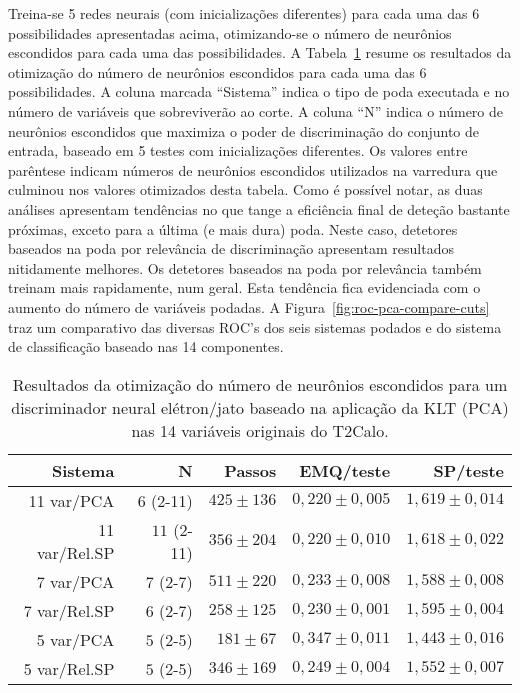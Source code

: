 Treina-se 5 redes neurais (com inicializações diferentes) para cada uma das 6
possibilidades apresentadas acima, otimizando-se o número de neurônios
escondidos para cada uma das possibilidades. A
Tabela~\ref{tab:pca-cuts-hidden} resume os resultados da otimização do número
de neurônios escondidos para cada uma das 6 possibilidades. A coluna marcada
``Sistema'' indica o tipo de poda executada e no número de variáveis que
sobreviverão ao corte. A coluna ``N'' indica o número de neurônios escondidos
que maximiza o poder de discriminação do conjunto de entrada, baseado em 5
testes com inicializações diferentes. Os valores entre parêntese indicam
números de neurônios escondidos utilizados na varredura que culminou nos
valores otimizados desta tabela. Como é possível notar, as duas análises
apresentam tendências no que tange a eficiência final de deteção bastante
próximas, exceto para a última (e mais dura) poda. Neste caso, detetores
baseados na poda por relevância de discriminação apresentam resultados
nitidamente melhores. Os detetores baseados na poda por relevância também
treinam mais rapidamente, num geral. Esta tendência fica evidenciada com o
aumento do número de variáveis podadas. A
Figura~\ref{fig:roc-pca-compare-cuts} traz um comparativo das diversas ROC's
dos seis sistemas podados e do sistema de classificação baseado nas 14
componentes.

\begin{table}
\caption{Resultados da otimização do número de neurônios escondidos para um
discriminador neural elétron/jato baseado na aplicação da KLT (PCA) nas 14
variáveis originais do T2Calo.}
\label{tab:pca-cuts-hidden}
\begin{center}
\begin{tabular}{|r|r|r|r|r|} \hline
Sistema & N & Passos & EMQ/teste & SP/teste \\ \hline \hline
11 var/PCA & $6$ (2-11) & $425\pm136$ & $0,220\pm0,005$ & $1,619\pm0,014$ \\
\hline  
11 var/Rel.SP & $11$ (2-11) & $356\pm204$ & $0,220\pm0,010$ & $1,618\pm0,022$
\\ \hline  
7 var/PCA & $7$ (2-7) & $511\pm220$ & $0,233\pm0,008$ & $1,588\pm0,008$ \\
\hline  
7 var/Rel.SP & $6$ (2-7) & $258\pm125$ & $0,230\pm0,001$ & $1,595\pm0,004$ \\
\hline  
5 var/PCA & $5$ (2-5) & $181\pm67$ & $0,347\pm0,011$ & $1,443\pm0,016$ \\
\hline  
5 var/Rel.SP & $5$ (2-5) & $346\pm169$ & $0,249\pm0,004$ & $1,552\pm0,007$ \\
\hline  
\end{tabular}
\end{center}
\end{table}

